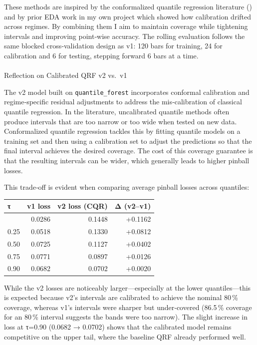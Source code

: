 \documentclass[
  a4paper,
  DIV=11,
  numbers=noendperiod]{scrreprt}
\makeatletter
\let\oldparagraph\paragraph
\renewcommand{\paragraph}{
    \@ifstar
      \xxxParagraphStar
      \xxxParagraphNoStar
  }
\newcommand{\xxxParagraphStar}[1]{\oldparagraph*{#1}\mbox{}}
\newcommand{\xxxParagraphNoStar}[1]{\oldparagraph{#1}\mbox{}}
\makeatother
\begin{document}
These methods are inspired by the conformalized quantile regression
literature () and by prior EDA work in my own project which showed how
calibration drifted across regimes. By combining them I aim to maintain
coverage while tightening intervals and improving point‑wise accuracy.
The rolling evaluation follows the same blocked cross‑validation design
as v1: 120 bars for training, 24 for calibration and 6 for testing,
stepping forward 6 bars at a time.

\paragraph{Reflection on Calibrated QRF v2
vs.~v1}\label{reflection-on-calibrated-qrf-v2-vs.-v1}

The v2 model built on \texttt{quantile\_forest} incorporates conformal
calibration and regime‑specific residual adjustments to address the
mis‑calibration of classical quantile regression. In the literature,
uncalibrated quantile methods often produce intervals that are too
narrow or too wide when tested on new data. Conformalized quantile
regression tackles this by fitting quantile models on a training set and
then using a calibration set to adjust the predictions so that the final
interval achieves the desired coverage. The cost of this coverage
guarantee is that the resulting intervals can be wider, which generally
leads to higher pinball losses.

This trade‑off is evident when comparing average pinball losses across
quantiles:

\begin{longtable}[]{@{}lrrr@{}}
\toprule\noalign{}
τ & v1 loss & v2 loss (CQR) & Δ (v2--v1) \\
\midrule\noalign{}
\endhead
\bottomrule\noalign{}
\endlastfoot
0.10 & 0.0286 & 0.1448 & +0.1162 \\
0.25 & 0.0518 & 0.1330 & +0.0812 \\
0.50 & 0.0725 & 0.1127 & +0.0402 \\
0.75 & 0.0771 & 0.0897 & +0.0126 \\
0.90 & 0.0682 & 0.0702 & +0.0020 \\
\end{longtable}

While the v2 losses are noticeably larger---especially at the lower
quantiles---this is expected because v2's intervals are calibrated to
achieve the nominal 80\,\% coverage, whereas v1's intervals were sharper
but under‑covered (86.5\,\% coverage for an 80\,\% interval suggests the
bands were too narrow). The slight increase in loss at τ=0.90 (0.0682 →
0.0702) shows that the calibrated model remains competitive on the upper
tail, where the baseline QRF already performed well.
\end{document}
